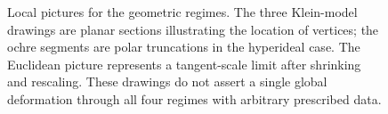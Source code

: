 \begin{figure}[htbp]
\caption{Local pictures for the geometric regimes. The three Klein-model
drawings are planar sections illustrating the location of vertices;
the ochre segments are polar truncations in the hyperideal case.
The Euclidean picture represents a tangent-scale limit after shrinking
and rescaling. These drawings do not assert a single global deformation
through all four regimes with arbitrary prescribed data.}
\label{fig:mono-polyhedral-regimes}
\end{figure}
